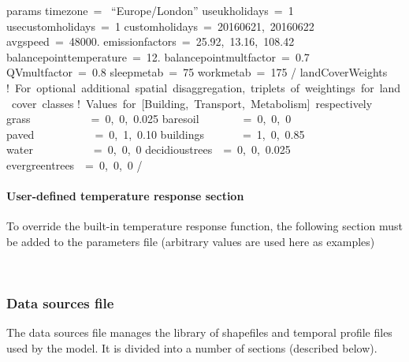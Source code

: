 \documentclass[letterpaper,10pt,english]{sphinxmanual}
\begin{document}
%
\begin{sphinxVerbatim}[commandchars=\\\{\}]
\PYGZam{}params
   timezone = \PYGZbs{} “Europe/London”
   use\PYGZus{}uk\PYGZus{}holidays = 1
   use\PYGZus{}custom\PYGZus{}holidays = 1
   custom\PYGZus{}holidays = \PYGZsq{}2016\PYGZhy{}06\PYGZhy{}21\PYGZsq{}, \PYGZsq{}2016\PYGZhy{}06\PYGZhy{}22\PYGZsq{}
   avgspeed = 48000.
   emissionfactors = 25.92, 13.16, 108.42
   balance\PYGZus{}point\PYGZus{}temperature = 12.
   balance\PYGZus{}point\PYGZus{}multfactor = 0.7
   QV\PYGZus{}multfactor = 0.8
   sleep\PYGZus{}metab = 75
   work\PYGZus{}metab = 175
/
\PYGZam{}landCoverWeights
   ! For optional additional spatial disaggregation, triplets of weightings for land cover classes
   ! Values for [Building, Transport, Metabolism] respectively
   grass           = 0, 0, 0.025
   baresoil        = 0, 0, 0
   paved           = 0, 1, 0.10
   buildings       = 1, 0, 0.85
   water           = 0, 0, 0
   decidioustrees  = 0, 0, 0.025
   evergreentrees  = 0, 0, 0
/
\end{sphinxVerbatim}


\paragraph{User-defined temperature response section}
\label{\detokenize{OtherManuals/LQF_Manual:user-defined-temperature-response-section}}
To override the built-in temperature response function, the following
section must be added to the parameters file (arbitrary values are used
here as examples)

%
\begin{sphinxVerbatim}[commandchars=\\\{\}]
     
     
     
     
     
     
     
\end{sphinxVerbatim}


\subsubsection{Data sources file}
\label{\detokenize{OtherManuals/LQF_Manual:data-sources-file}}
The data sources file manages the library of shapefiles and temporal
profile files used by the model. It is divided into a number of sections
(described below).
\end{document}
